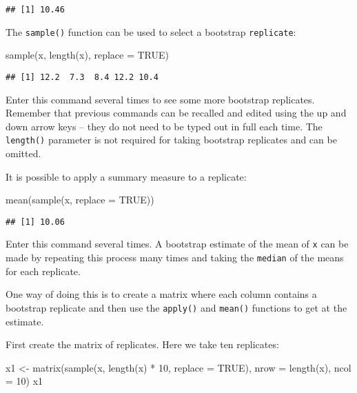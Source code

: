 \documentclass[
  12pt,
  a4paper]{book}
\newenvironment{Shaded}{\begin{snugshade}}{\end{snugshade}}
\newcommand{\AttributeTok}[1]{\textcolor[rgb]{0.77,0.63,0.00}{#1}}
\newcommand{\ConstantTok}[1]{\textcolor[rgb]{0.00,0.00,0.00}{#1}}
\newcommand{\DecValTok}[1]{\textcolor[rgb]{0.00,0.00,0.81}{#1}}
\newcommand{\FunctionTok}[1]{\textcolor[rgb]{0.00,0.00,0.00}{#1}}
\newcommand{\NormalTok}[1]{#1}
\newcommand{\OtherTok}[1]{\textcolor[rgb]{0.56,0.35,0.01}{#1}}
\newcommand{\SpecialCharTok}[1]{\textcolor[rgb]{0.00,0.00,0.00}{#1}}
\begin{document}
\begin{verbatim}
## [1] 10.46
\end{verbatim}

The \texttt{sample()} function can be used to select a bootstrap \texttt{replicate}:

\begin{Shaded}
\begin{Highlighting}[]
\FunctionTok{sample}\NormalTok{(x, }\FunctionTok{length}\NormalTok{(x), }\AttributeTok{replace =} \ConstantTok{TRUE}\NormalTok{)}
\end{Highlighting}
\end{Shaded}

\begin{verbatim}
## [1] 12.2  7.3  8.4 12.2 10.4
\end{verbatim}

Enter this command several times to see some more bootstrap replicates. Remember that previous commands can be recalled and edited using the up and down arrow keys -- they do not need to be typed out in full each time. The \texttt{length()} parameter is not required for taking bootstrap replicates and can be omitted.

It is possible to apply a summary measure to a replicate:

\begin{Shaded}
\begin{Highlighting}[]
\FunctionTok{mean}\NormalTok{(}\FunctionTok{sample}\NormalTok{(x, }\AttributeTok{replace =} \ConstantTok{TRUE}\NormalTok{))}
\end{Highlighting}
\end{Shaded}

\begin{verbatim}
## [1] 10.06
\end{verbatim}

Enter this command several times. A bootstrap estimate of the mean of \texttt{x} can be made by repeating this process many times and taking the \texttt{median} of the means for each replicate.

One way of doing this is to create a matrix where each column contains a bootstrap replicate and then use the \texttt{apply()} and \texttt{mean()} functions to get at the estimate.

First create the matrix of replicates. Here we take ten replicates:

\begin{Shaded}
\begin{Highlighting}[]
\NormalTok{x1 }\OtherTok{\textless{}{-}} \FunctionTok{matrix}\NormalTok{(}\FunctionTok{sample}\NormalTok{(x, }\FunctionTok{length}\NormalTok{(x) }\SpecialCharTok{*} \DecValTok{10}\NormalTok{, }\AttributeTok{replace =} \ConstantTok{TRUE}\NormalTok{),}
             \AttributeTok{nrow =} \FunctionTok{length}\NormalTok{(x), }\AttributeTok{ncol =} \DecValTok{10}\NormalTok{)}
\NormalTok{x1}
\end{Highlighting}
\end{Shaded}
\end{document}
